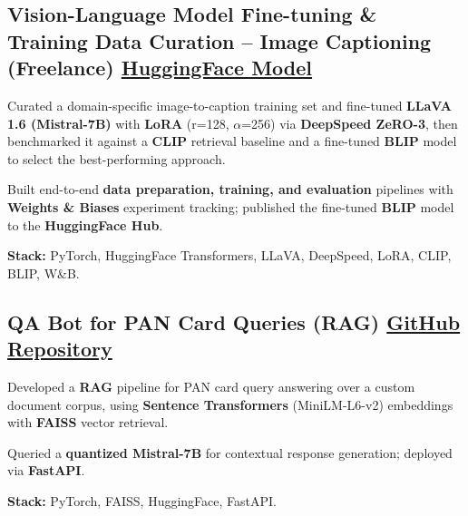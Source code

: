 \documentclass[letter,10pt]{article}
\begin{document}
\subsection{Vision-Language Model Fine-tuning \& Training Data Curation – Image Captioning (Freelance) \hfill \href{https://huggingface.co/sunil448832/blip-model}{HuggingFace Model}}
\begin{zitemize}
\item Curated a domain-specific image-to-caption training set and fine-tuned \textbf{LLaVA 1.6 (Mistral-7B)} with \textbf{LoRA} (r=128, $\alpha$=256) via \textbf{DeepSpeed ZeRO-3}, then benchmarked it against a \textbf{CLIP} retrieval baseline and a fine-tuned \textbf{BLIP} model to select the best-performing approach.
\item Built end-to-end \textbf{data preparation, training, and evaluation} pipelines with \textbf{Weights \& Biases} experiment tracking; published the fine-tuned \textbf{BLIP} model to the \textbf{HuggingFace Hub}.
\item \textbf{Stack:} PyTorch, HuggingFace Transformers, LLaVA, DeepSpeed, LoRA, CLIP, BLIP, W\&B.
\end{zitemize}

\subsection{QA Bot for PAN Card Queries (RAG) \hfill \href{https://github.com/sunil448832/Natural-Language-Processing/tree/master/RAG(Retrieval\%20Augment\%20Generation)}{GitHub Repository}}
\begin{zitemize}
\item Developed a \textbf{RAG} pipeline for PAN card query answering over a custom document corpus, using \textbf{Sentence Transformers} (MiniLM-L6-v2) embeddings with \textbf{FAISS} vector retrieval.
\item Queried a \textbf{quantized Mistral-7B} for contextual response generation; deployed via \textbf{FastAPI}.
\item \textbf{Stack:} PyTorch, FAISS, HuggingFace, FastAPI.
\end{zitemize}
\end{document}
